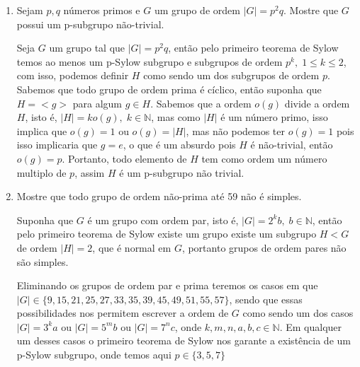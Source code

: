 \documentclass{article}
\begin{document}
\begin{enumerate}
		\item Sejam $p,q$ números primos e $G$ um grupo de ordem $|G| = p^{2}q$. Mostre que $G$ possui um p-subgrupo não-trivial.
		
		Seja $G$ um grupo tal que $|G| = p^{2}q$, então pelo primeiro teorema de Sylow temos ao menos um p-Sylow subgrupo e subgrupos de ordem $p^{k}, \; 1 \leq k \leq 2$, com isso, podemos definir $H$ como sendo um dos subgrupos de ordem $p$. Sabemos que todo grupo de ordem prima é cíclico, então suponha que $H = <g>$ para algum $g \in H$. Sabemos que a ordem $o(g)$ divide a ordem $H$, isto é, $|H| = ko(g), \; k \in \mathbb{N}$, mas como $|H|$ é um número primo, isso implica que $o(g) = 1$ ou $o(g) = |H|$, mas não podemos ter $o(g) = 1$ pois isso implicaria que $g = e$, o que é um absurdo pois $H$ é não-trivial, então $o(g) = p$. Portanto, todo elemento de $H$ tem como ordem um número multiplo de $p$, assim $H$ é um p-subgrupo não trivial.
		
		\item Mostre que todo grupo de ordem não-prima até 59 não é simples.
		
		Suponha que $G$ é um grupo com ordem par, isto é, $|G| = 2^{k}b, \; b \in \mathbb{N}$, então pelo primeiro teorema de Sylow existe um grupo existe um subgrupo $H < G$ de ordem $|H| = 2$, que é normal em $G$, portanto grupos de ordem pares não são simples.
		
		Eliminando os grupos de ordem par e prima teremos os casos em que $|G| \in \{9, 15, 21, 25, 27, 33, 35, 39, 45, 49, 51, 55, 57\}$, sendo que essas possibilidades nos permitem escrever a ordem de $G$ como sendo um dos casos $|G| = 3^{k}a$ ou $|G| = 5^{m}b$ ou $|G| = 7^{n}c$, onde $k, m, n, a, b, c \in \mathbb{N}$. Em qualquer um desses casos o primeiro teorema de Sylow nos garante a existência de um p-Sylow subgrupo, onde temos aqui $p \in \{3, 5, 7\}$
		
	\end{enumerate}
	
	
\end{document}
